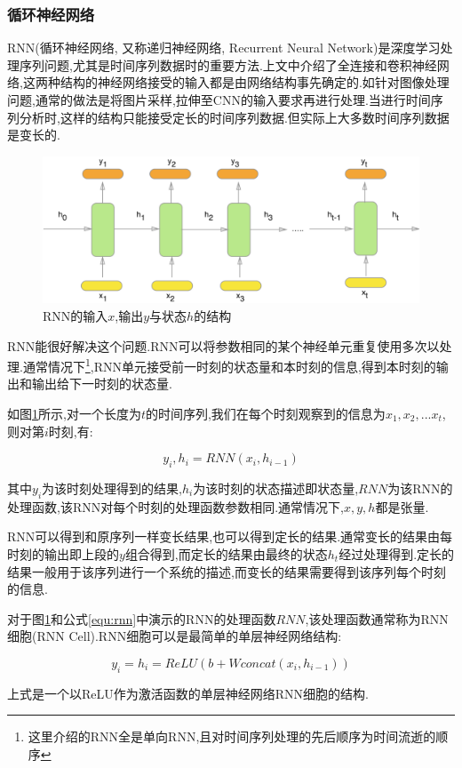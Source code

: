 \subsubsection{循环神经网络} \label{section:rnn}
RNN(循环神经网络, 又称递归神经网络, Recurrent Neural Network)是深度学习处理序列问题,尤其是时间序列数据时的重要方法.上文中介绍了全连接和卷积神经网络,这两种结构的神经网络接受的输入都是由网络结构事先确定的.如针对图像处理问题,通常的做法是将图片采样,拉伸至CNN的输入要求再进行处理.当进行时间序列分析时,这样的结构只能接受定长的时间序列数据.但实际上大多数时间序列数据是变长的.
\par
\begin{figure}[htbp!]
    \centering
    \includegraphics[width = 1.\textwidth]{chap/img/rnn.png}
    \caption{
        RNN的输入$x$,输出$y$与状态$h$的结构\supercite{how_rnn_work}
        }\label{fig:rnn}
\end{figure}
\par
RNN能很好解决这个问题.RNN可以将参数相同的某个神经单元重复使用多次以处理.通常情况下\footnote{这里介绍的RNN全是单向RNN,且对时间序列处理的先后顺序为时间流逝的顺序},RNN单元接受前一时刻的状态量和本时刻的信息,得到本时刻的输出和输出给下一时刻的状态量.
\par
如图\ref{fig:rnn}所示,对一个长度为$t$的时间序列,我们在每个时刻观察到的信息为$x_1, x_2, ...x_t$,则对第$i$时刻,有:
\par
\begin{equation} \label{equ:rnn} y_i,h_i = RNN(x_i, h_{i-1})  \end{equation}
\par
其中$y_i$为该时刻处理得到的结果,$h_i$为该时刻的状态描述即状态量,$RNN$为该RNN的处理函数,该RNN对每个时刻的处理函数参数相同.通常情况下,$x,y,h$都是张量.
\par
RNN可以得到和原序列一样变长结果,也可以得到定长的结果.通常变长的结果由每时刻的输出即上段的$y$组合得到,而定长的结果由最终的状态$h_t$经过处理得到.定长的结果一般用于该序列进行一个系统的描述,而变长的结果需要得到该序列每个时刻的信息.
\par
对于图\ref{fig:rnn}和公式\ref{equ:rnn}中演示的RNN的处理函数$RNN$,该处理函数通常称为RNN细胞(RNN Cell).RNN细胞可以是最简单的单层神经网络结构:
\par
\begin{equation} \label{equ:simple_rnn} y_i = h_i = ReLU(b + W concat(x_i, h_{i-1}))  \end{equation}
\par
上式是一个以ReLU作为激活函数的单层神经网络RNN细胞的结构.
\par

